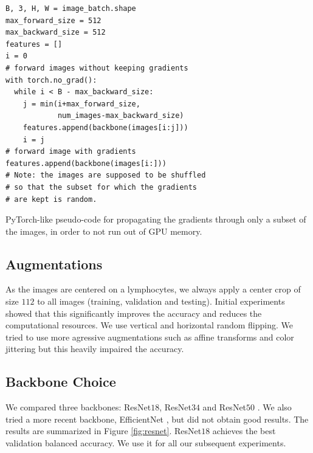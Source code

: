 \documentclass[final]{cvpr}
\begin{document}
\begin{table}[h]
	\renewcommand\tablename{Pseudo-code}
	\begin{Verbatim}[fontsize=\footnotesize, samepage=true, frame=single]
B, 3, H, W = image_batch.shape
max_forward_size = 512
max_backward_size = 512
features = []
i = 0
# forward images without keeping gradients
with torch.no_grad():
  while i < B - max_backward_size:
    j = min(i+max_forward_size,
            num_images-max_backward_size)
    features.append(backbone(images[i:j]))
    i = j
# forward image with gradients
features.append(backbone(images[i:]))
# Note: the images are supposed to be shuffled
# so that the subset for which the gradients
# are kept is random.
	\end{Verbatim}
    \caption{PyTorch-like pseudo-code for propagating the gradients through only a subset of the images, in order to not run out of GPU memory.}
	\label{alg1}
\end{table}




\subsection{Augmentations}
As the images are centered on a lymphocytes, we always apply a center crop of size $112$ to all images (training, validation and testing). Initial experiments showed that this significantly improves the accuracy and reduces the computational resources. We use vertical and horizontal random flipping. We tried to use more agressive augmentations such as affine transforms and color jittering but this heavily impaired the accuracy.

\subsection{Backbone Choice}
We compared three backbones: ResNet$18$, ResNet$34$ and ResNet$50$ \cite{resnet}. We also tried a more recent backbone, EfficientNet \cite{efn}, but did not obtain good results.
The results are summarized in Figure \ref{fig:resnet}. ResNet$18$ achieves the best validation balanced accuracy. We use it for all our subsequent experiments.
\end{document}

